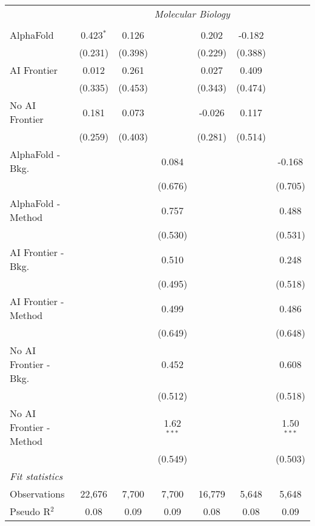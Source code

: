 \begin{tabular}{lcccccc}
 & \multicolumn{6}{c}{\textit{Molecular Biology}} \\ \\
   AlphaFold               & 0.423$^{*}$ & 0.126   &              & 0.202   & -0.182  &   \\   
                           & (0.231)     & (0.398) &              & (0.229) & (0.388) &   \\   
   AI Frontier             & 0.012       & 0.261   &              & 0.027   & 0.409   &   \\   
                           & (0.335)     & (0.453) &              & (0.343) & (0.474) &   \\   
   No AI Frontier          & 0.181       & 0.073   &              & -0.026  & 0.117   &   \\   
                           & (0.259)     & (0.403) &              & (0.281) & (0.514) &   \\   
   AlphaFold - Bkg.        &             &         & 0.084        &         &         & -0.168\\   
                           &             &         & (0.676)      &         &         & (0.705)\\   
   AlphaFold - Method      &             &         & 0.757        &         &         & 0.488\\   
                           &             &         & (0.530)      &         &         & (0.531)\\   
   AI Frontier - Bkg.      &             &         & 0.510        &         &         & 0.248\\   
                           &             &         & (0.495)      &         &         & (0.518)\\   
   AI Frontier - Method    &             &         & 0.499        &         &         & 0.486\\   
                           &             &         & (0.649)      &         &         & (0.648)\\   
   No AI Frontier - Bkg.   &             &         & 0.452        &         &         & 0.608\\   
                           &             &         & (0.512)      &         &         & (0.518)\\   
   No AI Frontier - Method &             &         & 1.62$^{***}$ &         &         & 1.50$^{***}$\\   
                           &             &         & (0.549)      &         &         & (0.503)\\   
   \midrule
   \emph{Fit statistics}\\
   Observations            & 22,676      & 7,700   & 7,700        & 16,779  & 5,648   & 5,648\\  
   Pseudo R$^2$            & 0.08        & 0.09    & 0.09         & 0.08    & 0.08    & 0.09\\  
   

\end{tabular}
